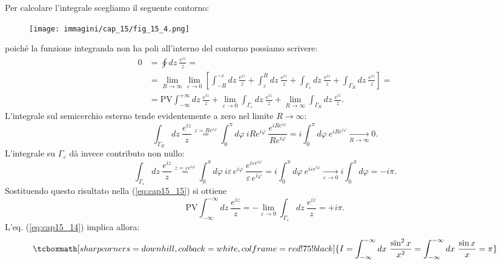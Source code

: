 Per calcolare l'integrale scegliamo il seguente contorno:
\begin{figure}[!htbp]
\begin{center}
\texttt{[image: immagini/cap\_15/fig\_15\_4.png]}
\end{center}
\end{figure}
poiché la funzione integranda non ha poli all'interno del contorno possiamo scrivere:
	\begin{align}
		0 & =  \oint  dz\ \frac{e^{iz}}{z} = \nonumber \\
		&= \lim _{R\rightarrow \infty} \lim _{\varepsilon\rightarrow 0} \left[ \int _{-R} ^{-\varepsilon}dz\ \frac{e^{iz}}{z}+\int _{\varepsilon} ^{R}dz\ \frac{e^{iz}}{z}+\int _{\Gamma _{\varepsilon}} dz\ \frac{e^{iz}}{z} +\int _{\Gamma _{R}} dz\ \frac{e^{iz}}{z}\right] = \nonumber\\
		&= \textrm{PV}\int _{-\infty} ^{+\infty}dz\ \frac{e^{iz}}{z}+ \lim _{\varepsilon\rightarrow 0}  \int _{\Gamma _{\varepsilon}} dz\ \frac{e^{iz}}{z}+\lim _{R\rightarrow \infty}\int _{\Gamma _{R}} dz\ \frac{e^{iz}}{z}.
	\label{eq:cap15_15}
	\end{align}
L'integrale sul semicerchio esterno tende evidentemente a zero nel limite $R\rightarrow \infty $:
	\begin{equation}
		\int _{\Gamma _{R}} dz\ \frac{e^{iz}}{z} \overset{z= Re^{i\varphi}}{=} \int _0 ^{\pi} d\varphi \ i R e^{i\varphi}\ \frac{e^{iRe^{i\varphi}}}{Re^{i\varphi}} = i\int _0 ^{\pi} d\varphi \ e^{iRe^{i\varphi}} \underset{R\rightarrow \infty}{\longrightarrow}0.
	\end{equation}
L'integrale su $\Gamma _{\varepsilon}$ dà invece contributo non nullo:
	\begin{equation}
		\int _{\Gamma _{\varepsilon}} dz\ \frac{e^{iz}}{z} \overset{z= \varepsilon e^{i\varphi}}{=} \int _0 ^{\pi} d\varphi \ i \varepsilon\, e^{i\varphi}\ \frac{e^{i\varepsilon  e^{i\varphi}}}{\varepsilon\, e^{i\varphi}} =  i\int _0 ^{\pi} d\varphi \ e^{i\varepsilon e^{i\varphi}} \underset{\varepsilon\rightarrow 0}{\longrightarrow}i\int _0 ^{\pi} d\varphi = -i\pi.
	\end{equation}
Sostituendo questo risultato nella (\ref{eq:cap15_15}) si ottiene
	\begin{equation}
		\textrm{PV} \int _{-\infty} ^{-\infty} dz\ \frac{e^{iz}}{z} =-\lim _{\varepsilon \rightarrow 0} \int _{\Gamma _{\varepsilon}} dz\ \frac{e^{iz}}{z}= +i\pi.
	\end{equation}
L'eq. (\ref{eq:cap15_14}) implica allora:
	\begin{equation}
		\tcboxmath[sharp corners=downhill, colback=white, colframe=red!75!black]{
			I= \int _{-\infty} ^{-\infty} dx\ \frac{\sin ^2  x}{x^2}= \int _{-\infty} ^{-\infty} dx\ \frac{\sin  x}{x}= \pi
			}
	\end{equation}
\newpage
